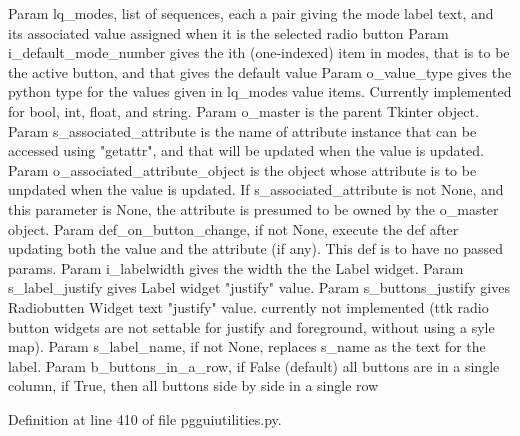 \begin{DoxyVerb}Param lq_modes, list of sequences, each a pair
    giving the mode label text, and its associated value
    assigned when it is the selected radio button
Param i_default_mode_number gives the ith (one-indexed)
    item in modes, that is to be the active button,
    and that gives the default value
Param o_value_type gives the python type for the values
    given in lq_modes value items.  Currently implemented
    for bool, int, float, and string.
Param o_master is the parent Tkinter object.
Param s_associated_attribute is the name of 
    attribute instance that can be accessed
    using "getattr", and that will be
    updated when the value is updated.
Param o_associated_attribute_object is the object whose attribute
    is to be unpdated when the value is updated.  If
    s_associated_attribute is not None, and this parameter
    is None, the attribute is presumed to be
    owned by the o_master object.
Param def_on_button_change, if not None, execute the def
    after updating both the value and the attribute (if any).
    This def is to have no passed params.
Param i_labelwidth gives the width the the Label widget.
Param s_label_justify gives Label widget "justify" value.
Param s_buttons_justify gives Radiobutten Widget text "justify" value.
currently not implemented (ttk radio button widgets are not
settable for justify and foreground, without using a syle map).
Param s_label_name, if not None, replaces s_name as the text for the label.
Param b_buttons_in_a_row, if False (default) all buttons are in a single column, if True,
then all buttons side by side in a single row
\end{DoxyVerb}
 

Definition at line 410 of file pgguiutilities.\+py.


